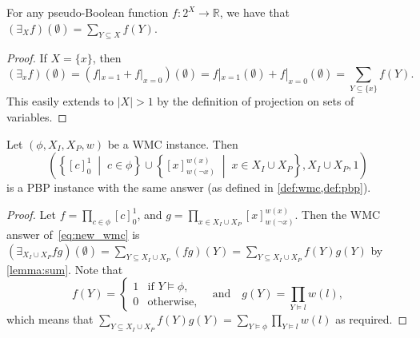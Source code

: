 \begin{lemma} \label{lemma:sum}
  For any pseudo-Boolean function $f\colon 2^X \to \mathbb{R}$, we have that
  $(\exists_X f)(\emptyset) = \sum_{Y \subseteq X} f(Y)$.
\end{lemma}
\begin{proof}
  If $X = \{x\}$, then
  \[
    (\exists_{x}f)(\emptyset) = (f|_{x=1} + f|_{x=0})(\emptyset) = f|_{x=1}(\emptyset) + f|_{x=0}(\emptyset) = \sum_{Y \subseteq \{x\}} f(Y).
  \]
  This easily extends to $|X| > 1$ by the definition of projection on sets of
  variables.
\end{proof}

\begin{proposition}\label{prop:equivalence}
  Let $(\phi, X_I, X_P, w)$ be a WMC instance. Then
  \begin{equation}
  \left(\left\{[c]_0^1 \;\middle|\; c \in \phi\right\} \cup \left\{[x]_{w(\neg
        x)}^{w(x)} \;\middle|\; x \in X_I \cup X_P\right\}, X_I \cup X_P,
    1\right) \label{eq:new_wmc}
  \end{equation}
  is a PBP instance with the same answer (as defined in \cref{def:wmc,def:pbp}).
\end{proposition}
\begin{proof}
  Let $f = \prod_{c \in \phi} [c]_0^1$, and
  $g = \prod_{x \in X_I \cup X_P} {[x]}_{w(\neg x)}^{w(x)}$. Then the WMC answer
  of~\eqref{eq:new_wmc} is
  $(\exists_{X_I \cup X_P} fg)(\emptyset) = \sum_{Y \subseteq X_I \cup X_P} (fg)(Y) = \sum_{Y \subseteq X_I \cup X_P} f(Y)g(Y)$
  by \cref{lemma:sum}. Note that
  \[
    f(Y) =
    \begin{cases}
      1 & \text{if } Y \models \phi, \\
      0 & \text{otherwise},
    \end{cases}
    \quad
    \text{and}
    \quad
    g(Y) = \prod_{Y \models l} w(l),
  \]
  which means that $\sum_{Y \subseteq X_I \cup X_P} f(Y)g(Y) = \sum_{Y \models
    \phi} \prod_{Y \models l} w(l)$ as required.
\end{proof}

